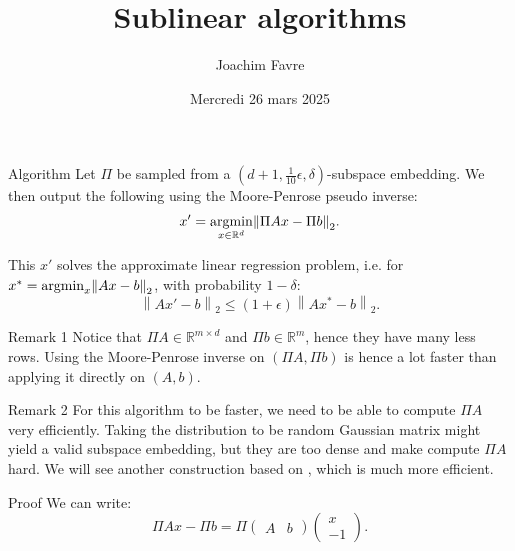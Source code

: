 \documentclass[a4paper]{article}
\title{Sublinear algorithms}
\author{Joachim Favre}
\date{Mercredi 26 mars 2025}
\begin{document}
\maketitle


\begin{parag}{Algorithm}
    Let $\Pi$ be sampled from a $\left(d+1, \frac{1}{10} \epsilon, \delta\right)$-subspace embedding. We then output the following using the Moore-Penrose pseudo inverse:
    \[x' = \argmin_{x \in \mathbb{R}^d} \left\|\Pi A x - \Pi b\right\|_2.\]

    This $x'$ solves the approximate linear regression problem, i.e. for $x^* = \argmin_x \left\|A x - b\right\|_2$, with probability $1 - \delta$: 
    \[\left\|A x' - b\right\|_2 \leq \left(1 + \epsilon\right) \left\|A x^* - b\right\|_2.\]
    
    \begin{subparag}{Remark 1}
        Notice that $\Pi A \in \mathbb{R}^{m \times d}$ and $\Pi b \in \mathbb{R}^m$, hence they have many less rows. Using the Moore-Penrose inverse on $\left(\Pi A, \Pi b\right)$ is hence a lot faster than applying it directly on $\left(A, b\right)$.
    \end{subparag}
    
    \begin{subparag}{Remark 2}
        For this algorithm to be faster, we need to be able to compute $\Pi A$ very efficiently. Taking the distribution to be random Gaussian matrix might yield a valid subspace embedding, but they are too dense and make compute $\Pi A$ hard. We will see another construction based on , which is much more efficient.
    \end{subparag}

    \begin{subparag}{Proof}
        We can write: 
        \[\Pi A x - \Pi b = \Pi \begin{pmatrix} A & b \end{pmatrix} \begin{pmatrix} x \\ -1 \end{pmatrix}.\]


\end{subparag}
\end{parag}
\end{document}
